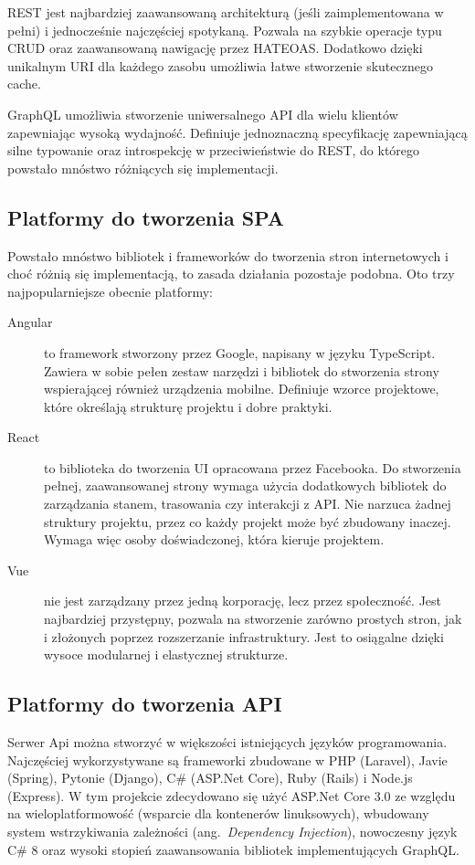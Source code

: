 		REST jest najbardziej zaawansowaną architekturą (jeśli zaimplementowana w pełni) i jednocześnie najczęściej spotykaną.
		Pozwala na szybkie operacje typu CRUD oraz zaawansowaną nawigację przez HATEOAS.
		Dodatkowo dzięki unikalnym URI dla każdego zasobu umożliwia łatwe stworzenie skutecznego cache.

		GraphQL umożliwia stworzenie uniwersalnego API dla wielu klientów zapewniając wysoką wydajność.
		Definiuje jednoznaczną specyfikację zapewniającą silne typowanie oraz introspekcję w przeciwieństwie do REST,
		do którego powstało mnóstwo różniących się implementacji.

	\subsection{Platformy do tworzenia SPA}
		Powstało mnóstwo bibliotek i frameworków do tworzenia stron internetowych i choć różnią się implementacją, to zasada działania pozostaje podobna.
		Oto trzy najpopularniejsze obecnie platformy:
		\begin{description}
			\item[Angular] to framework stworzony przez Google, napisany w języku TypeScript.
				Zawiera w sobie pełen zestaw narzędzi i bibliotek do stworzenia strony wspierającej również urządzenia mobilne.
				Definiuje wzorce projektowe, które określają strukturę projektu i dobre praktyki.

			\item[React] to biblioteka do tworzenia UI opracowana przez Facebooka.
				Do stworzenia pełnej, zaawansowanej strony wymaga użycia dodatkowych bibliotek do zarządzania stanem, trasowania czy interakcji z API.
				Nie narzuca żadnej struktury projektu, przez co każdy projekt może być zbudowany inaczej.
				Wymaga więc osoby doświadczonej, która kieruje projektem.

			\item[Vue] nie jest zarządzany przez jedną korporację, lecz przez społeczność.
				Jest najbardziej przystępny, pozwala na stworzenie zarówno prostych stron, jak i złożonych poprzez rozszerzanie infrastruktury.
				Jest to osiągalne dzięki wysoce modularnej i elastycznej strukturze.
		\end{description}

	\subsection{Platformy do tworzenia API}
		Serwer Api można stworzyć w większości istniejących języków programowania.
		Najczęściej wykorzystywane są frameworki zbudowane w PHP (Laravel), Javie (Spring), Pytonie (Django), C\# (ASP.Net Core), Ruby (Rails) i Node.js (Express).
		W tym projekcie zdecydowano się użyć ASP.Net Core 3.0 ze względu na wieloplatformowość (wsparcie dla kontenerów linuksowych),
		wbudowany system wstrzykiwania zależności (ang.\ \emph{Dependency Injection}), nowoczesny język C\# 8 oraz wysoki stopień zaawansowania bibliotek implementujących GraphQL.